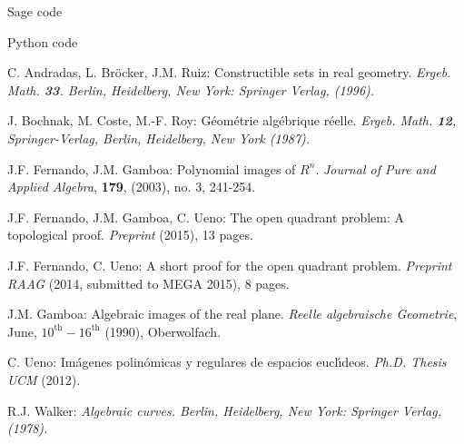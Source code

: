 \documentclass[11pt, a4paper, english, twoside, notitlepage, openright]{report}
\begin{document}
\begin{chapter}{Sage code}

\end{chapter}

\begin{chapter}{Python code}

\end{chapter}

\begin{thebibliography}{ABR}

 C. Andradas, L. Br\"ocker, J.M. Ruiz: Constructible 
sets in real geometry. \em Ergeb. Math. \em{\bf 33}. Berlin, Heidelberg, 
New York: Springer Verlag, (1996).

 J. Bochnak, M. Coste, M.-F. Roy: G\'eom\'etrie
alg\'ebrique r\'eelle. \em Ergeb. Math. \em {\bf 12}, Springer-Verlag,
Berlin, Heidelberg, New York (1987).

 J.F. Fernando, J.M. Gamboa: Polynomial images of $R^n$.
\textit{Journal of Pure and Applied Algebra}, {\bf 179}, (2003), no. 3, 241-254.

 J.F. Fernando, J.M. Gamboa, C. Ueno: The open quadrant problem:
A topological proof. \textit{Preprint} (2015), 13 pages.

 J.F. Fernando, C. Ueno: A short proof for the open quadrant problem.
\textit{Preprint RAAG} (2014, submitted to MEGA 2015), 8 pages.

 J.M. Gamboa: Algebraic images of the real plane. \textit{Reelle algebraische Geometrie}, June,
$10^{\text{th}}-16^{\text{th}}$ (1990), Oberwolfach.

 C. Ueno: Im\'agenes polin\'omicas y regulares de espacios eucl\'\i deos. {\em Ph.D. Thesis UCM} (2012).

 R.J. Walker: \em Algebraic curves. \em Berlin, Heidelberg, 
New York: Springer Verlag, (1978).



\end{thebibliography}
\end{document}
